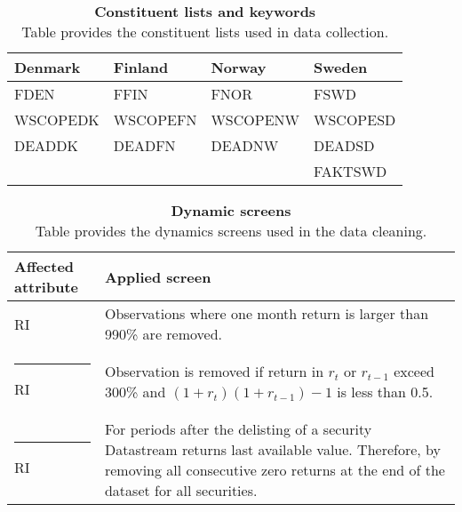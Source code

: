 \documentclass{article}
\begin{document}
\begin{table}[ht] 
\small
\caption[Constituent lists and keywords]{\textbf{Constituent lists and keywords}\\ Table provides the constituent lists used in data collection.}
 \label{table:constituteLists}
\centering
\begin{tabularx}{\textwidth}{X X X X}
\toprule
Denmark & Finland & Norway & Sweden \\
\midrule
FDEN 		&  FFIN		& FNOR		& FSWD\\
WSCOPEDK & WSCOPEFN & WSCOPENW& WSCOPESD\\
DEADDK 	&   DEADFN 	& DEADNW 	& DEADSD\\
& & & FAKTSWD\\
 \bottomrule
 \end{tabularx}
 \end{table} 
 
\begin{table}[ht] 
\small
\caption[Dynamic screens]{\textbf{Dynamic screens}\\ Table provides the dynamics screens used in the data cleaning.}
 \label{table:DynamicScreens}
\centering
\begin{tabularx}{\textwidth}{l X}
\toprule
Affected attribute & Applied screen \\
\midrule
RI 		& Observations where one month return is larger than 990\% are removed.\\ \rule{-1ex}{3ex}
RI		& Observation is removed if return in $r_t$ or $r_{t-1}$ exceed 300\% and $(1+r_{t})(1+r_{t-1}) -1$ is less than 0.5. \\ \rule{-1ex}{3ex}
RI 		& For periods after the delisting of a security Datastream returns last available value. Therefore, by removing all consecutive zero returns at the end of the dataset for all securities.\\
 \bottomrule
 \end{tabularx}
 \end{table} 
\end{document}
